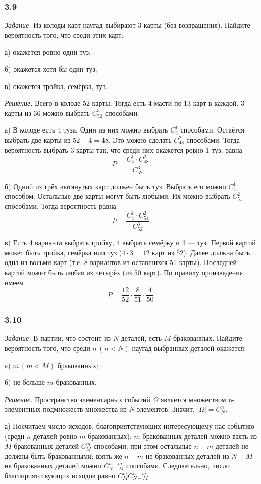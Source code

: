\documentclass{book}
\begin{document}
\subsubsection*{3.9}

\textit{Задание.} Из колоды карт наугад выбирают 3 карты (без возвращения).
Найдите вероятность того, что среди этих карт:

а) окажется ровно одни туз;

б) окажется хотя бы один туз;

в) окажется тройка, семёрка, туз.

\textit{Решение.} Всего в колоде 52 карты.
Тогда есть 4 масти по 13 карт в каждой.
3 карты из 36 можно выбрать $C_{52}^3$ способами.

а) В колоде есть 4 туза.
Один из них можно выбрать $C_4^1$ способами.
Остаётся выбрать две карты из $52-4=48$.
Это можно сделать $C_{48}^2$ способами.
Тогда вероятность выбрать 3 карты так, что среди них окажется ровно 1 туз, равна
$$P =
\frac{C_4^1 \cdot C_{48}^2}{C_{52}^3}.$$

б) Одной из трёх вытянутых карт должен быть туз.
Выбрать его можно $C_4^1$ способом.
Остальные две карты могут быть любыми.
Их можно выбрать $C_{51}^2$ способами.
Тогда вероятность равна
$$P =
\frac{C_4^1 \cdot C_{51}^2}{C_{52}^3}.$$

в) Есть 4 варианта выбрать тройку, 4 выбрать семёрку и 4 --- туз.
Первой картой может быть тройка, семёрка или туз ($4 \cdot 3 = 12$ карт из 52).
Далее должна быть одна из восьми карт (т.е. 8 вариантов из оставшихся 51 карты).
Последней картой может быть любая из четырёх (из 50 карт).
По правилу произведения имеем
$$P =
\frac{12}{52} \cdot \frac{8}{51} \cdot \frac{4}{50}.$$

\subsubsection*{3.10}

\textit{Задание.} В партии, что состоит из $N$ деталей, есть $M$ бракованных.
Найдите вероятность того, что среди $n \, \left( n < N \right)$ наугад выбранных деталей окажется:

а) $m \, \left( m < M \right) $ бракованных;

б) не больше $m$ бракованных.

\textit{Решение.} Пространство элементарных событий $ \Omega $ является множеством n-элементных подмножеств множества из $N$ элементов.
Значит, $| \Omega | = C_N^n$.

а) Посчитаем число исходов,
благоприятствующих интересующему нас событию
(среди $n$ деталей ровно $m$ бракованных):
$m$ бракованных деталей можно взять из $M$ бракованных деталей $C_M^m$ способами;
при этом остальные $n - m$ деталей не должны быть бракованными;
взять же $n - m$ не бракованных деталей из $N - M$ не бракованных деталей можно $C_{N-M}^{n-m}$ способами.
Следовательно, число благоприятствующих исходов равно $C_M^m C_{N-M}^{n-m}$.
\end{document}
